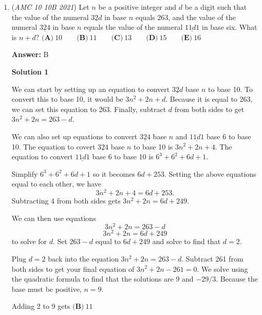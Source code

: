 \begin{enumerate}
\textbf{Solution 3}

Prime factorizing $N$, we have that there is $2^3$ in our factorization. Now, call the sum of the odd divisors $k$. We know that if we multiply k by 2, we will have even divisors. So, we can multiply k by 2, $2^2, 2^3$ respectively to get 14k as the sum of the even divisors. Therefore, the answer is 
 \[\frac{k}{14k} = \boxed{\textbf{(C)} ~1:14}.\]~MC

 


	\item (\textit{AMC 10 10B 2021}) Let $n$ be a positive integer and $d$ be a digit such that the value of the numeral $\underline{32d}$ in base $n$ equals $263$, and the value of the numeral $\underline{324}$ in base $n$ equals the value of the numeral $\underline{11d1}$ in base six. What is $n + d ?$
$\textbf{(A)} ~10 \qquad\textbf{(B)} ~11 \qquad\textbf{(C)} ~13 \qquad\textbf{(D)} ~15 \qquad\textbf{(E)} ~16$

 \textbf{Answer: }B



\textbf{Solution 1}

We can start by setting up an equation to convert $\underline{32d}$ base $n$ to base 10. To convert this to base 10, it would be $3{n}^2+2n+d.$ Because it is equal to 263, we can set this equation to 263. Finally, subtract $d$ from both sides to get $3{n}^2+2n = 263-d$.

 We can also set up equations to convert $\underline{324}$ base $n$ and $\underline{11d1}$ base 6 to base 10. The equation to covert $\underline{324}$ base $n$ to base 10 is $3{n}^2+2n+4.$ The equation to convert $\underline{11d1}$ base 6 to base 10 is ${6}^3+{6}^2+6d+1.$

 Simplify ${6}^3+{6}^2+6d+1$ so it becomes $6d+253.$ Setting the above equations equal to each other, we have 
 \[3{n}^2+2n+4 = 6d+253.\] Subtracting 4 from both sides gets $3{n}^2+2n = 6d+249.$

 We can then use equations
 \[3{n}^2+2n = 263-d\]
 \[3{n}^2+2n = 6d+249\]to solve for $d$. Set $263-d$ equal to $6d+249$ and solve to find that $d=2$.

 Plug $d=2$ back into the equation $3{n}^2+2n = 263-d$. Subtract 261 from both sides to get your final equation of $3{n}^2+2n-261 = 0.$ We solve using the quadratic formula to find that the solutions are $9$ and $-29/3.$ Because the base must be positive, $n=9.$

 Adding 2 to 9 gets $\boxed{\textbf{(B)} ~11}$


\end{enumerate}
